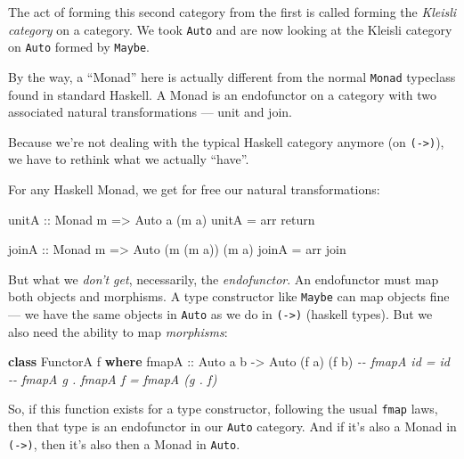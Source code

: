\documentclass[]{article}
\newenvironment{Shaded}{}{}
\newcommand{\CommentTok}[1]{\textcolor[rgb]{0.38,0.63,0.69}{\textit{#1}}}
\newcommand{\DataTypeTok}[1]{\textcolor[rgb]{0.56,0.13,0.00}{#1}}
\newcommand{\FunctionTok}[1]{\textcolor[rgb]{0.02,0.16,0.49}{#1}}
\newcommand{\KeywordTok}[1]{\textcolor[rgb]{0.00,0.44,0.13}{\textbf{#1}}}
\newcommand{\NormalTok}[1]{#1}
\newcommand{\OtherTok}[1]{\textcolor[rgb]{0.00,0.44,0.13}{#1}}
\begin{document}
The act of forming this second category from the first is called forming the
\emph{Kleisli category} on a category. We took \texttt{Auto} and are now looking
at the Kleisli category on \texttt{Auto} formed by \texttt{Maybe}.

By the way, a ``Monad'' here is actually different from the normal
\texttt{Monad} typeclass found in standard Haskell. A Monad is an endofunctor on
a category with two associated natural transformations --- unit and join.

Because we're not dealing with the typical Haskell category anymore (on
\texttt{(-\textgreater{})}), we have to rethink what we actually ``have''.

For any Haskell Monad, we get for free our natural transformations:

\begin{Shaded}
\begin{Highlighting}[]
\OtherTok{unitA ::} \DataTypeTok{Monad}\NormalTok{ m }\OtherTok{=\textgreater{}} \DataTypeTok{Auto}\NormalTok{ a (m a)}
\NormalTok{unitA }\OtherTok{=}\NormalTok{ arr }\FunctionTok{return}

\OtherTok{joinA ::} \DataTypeTok{Monad}\NormalTok{ m }\OtherTok{=\textgreater{}} \DataTypeTok{Auto}\NormalTok{ (m (m a)) (m a)}
\NormalTok{joinA }\OtherTok{=}\NormalTok{ arr join}
\end{Highlighting}
\end{Shaded}

But what we \emph{don't get}, necessarily, the \emph{endofunctor}. An
endofunctor must map both objects and morphisms. A type constructor like
\texttt{Maybe} can map objects fine --- we have the same objects in
\texttt{Auto} as we do in \texttt{(-\textgreater{})} (haskell types). But we
also need the ability to map \emph{morphisms}:

\begin{Shaded}
\begin{Highlighting}[]
\KeywordTok{class} \DataTypeTok{FunctorA}\NormalTok{ f }\KeywordTok{where}
\OtherTok{    fmapA ::} \DataTypeTok{Auto}\NormalTok{ a b }\OtherTok{{-}\textgreater{}} \DataTypeTok{Auto}\NormalTok{ (f a) (f b)}
    \CommentTok{{-}{-} fmapA id = id}
    \CommentTok{{-}{-} fmapA g . fmapA f = fmapA (g . f)}
\end{Highlighting}
\end{Shaded}

So, if this function exists for a type constructor, following the usual
\texttt{fmap} laws, then that type is an endofunctor in our \texttt{Auto}
category. And if it's also a Monad in \texttt{(-\textgreater{})}, then it's also
then a Monad in \texttt{Auto}.
\end{document}
